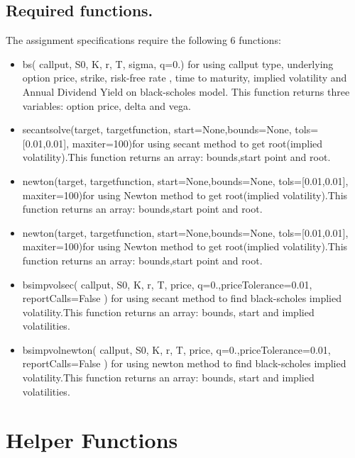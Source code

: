 \documentclass[a4paper]{article}
\begin{document}
\subsection{Required functions.}
 The assignment specifications require the following 6 functions:
\begin{itemize}
    	\item bs( callput, S0, K, r, T, sigma, q=0.) for using callput type, underlying option price, strike,  risk-free rate ,
time to maturity, implied volatility and Annual Dividend Yield on black-scholes model. This function returns three variables: option price, delta and vega.
    \end{itemize}
\begin{itemize}
    	\item secantsolve(target, targetfunction, start=None,bounds=None, tols=[0.01,0.01], maxiter=100)for using secant method to get root(implied volatility).This function returns an array: bounds,start point and root. 
    \end{itemize}
\begin{itemize}
    	\item newton(target, targetfunction, start=None,bounds=None, tols=[0.01,0.01], maxiter=100)for using Newton method to get root(implied volatility).This function returns an array: bounds,start point and root. 
\end{itemize}
\begin{itemize}
    	\item newton(target, targetfunction, start=None,bounds=None, tols=[0.01,0.01], maxiter=100)for using Newton method to get root(implied volatility).This function returns an array: bounds,start point and root. 
\end{itemize}
\begin{itemize}
    	\item bsimpvolsec( callput, S0, K, r, T, price, q=0.,priceTolerance=0.01, reportCalls=False ) for using secant method to find black-scholes implied volatility.This function returns an array: bounds, start and implied volatilities.
\end{itemize}
\begin{itemize}
    	\item bsimpvolnewton( callput, S0, K, r, T, price, q=0.,priceTolerance=0.01, reportCalls=False ) for using newton method to find black-scholes implied volatility.This function returns an array: bounds, start and implied volatilities.
\end{itemize}
\section{Helper Functions}
\end{document}
